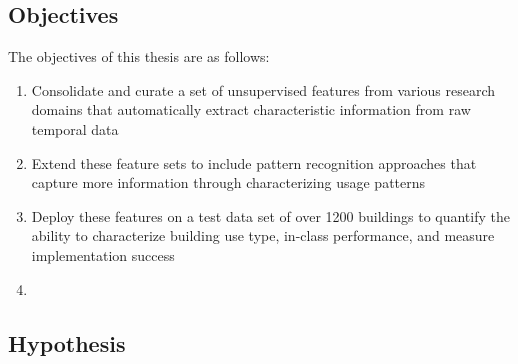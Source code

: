 
\subsection{Objectives}
The objectives of this thesis are as follows:
\begin{enumerate}
\item Consolidate and curate a set of unsupervised features from various research domains that automatically extract characteristic information from raw temporal data
\item Extend these feature sets to include pattern recognition approaches that capture more information through characterizing usage patterns
\item Deploy these features on a test data set of over 1200 buildings to quantify the ability to characterize building use type, in-class performance, and measure implementation success
\item 
\end{enumerate}


\subsection{Hypothesis}